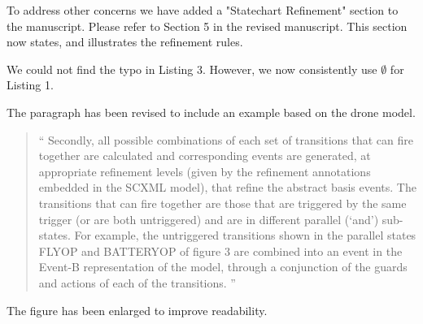 \documentclass{response}
\begin{document}
\begin{response}
  To address other concerns we have added a "Statechart Refinement" section 
  to the manuscript. Please refer to Section 5 in the revised manuscript.
  This section now states, and illustrates the refinement rules.
\end{response}


\begin{comment}{Reviewer \#1}
• p. 10 typo? listing 3 l. 10 \emptyset
\end{comment}

\begin{response}
  We could not find the typo in Listing 3. However, we now
  consistently use $\emptyset$ for Listing 1.
\end{response}

\begin{comment}{Reviewer \#1}
• p.13 Could you illustrate the sentence all possible combinations of each
set of transitions that can fire together are calculated and corresponding
events are generated, at appropriate refinement levels.
\end{comment}

\begin{response}
  The paragraph has been revised to include an example based on the drone model.
  \begin{quote}
    `` Secondly, all possible combinations of each set of transitions that can
    fire together are calculated and corresponding events are generated, at
    appropriate refinement levels (given by the refinement annotations
    embedded in the SCXML model), that refine the abstract basis events. The
    transitions that can fire together are those that are triggered by the same
    trigger (or are both untriggered) and are in different parallel (‘and’)
    sub-states. For example, the untriggered transitions shown in the parallel
    states FLYOP and BATTERYOP of figure 3 are combined into an event in the Event-B 
    representation of the model, through a conjunction of the guards and actions 
    of each of the transitions.  ''
  \end{quote}
\end{response}

\begin{comment}{Reviewer \#1}
• p.15 Fig. 5 is too small. One cannot read its text.
\end{comment}

\begin{response}
  The figure has been enlarged to improve readability.
\end{response}
\end{document}
